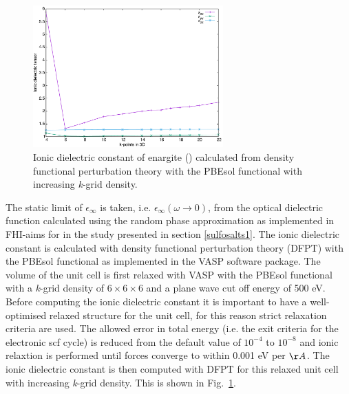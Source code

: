 \documentclass[11pt, twoside]{report}
\begin{document}
\begin{figure}[h!]
    \centering
    \includegraphics[width=0.65\textwidth]{figures/enargite_ionic_dielectric.pdf}
    \caption{Ionic dielectric constant of enargite ({\enargite}) calculated from density functional perturbation theory with the PBEsol functional with increasing \textit{k}-grid density.}
    \label{enargite_ionic_dielectric}
\end{figure}

The static limit of $\epsilon_{\infty}$ is taken, i.e.  $\epsilon_{\infty}(\omega \rightarrow 0)$, from the optical dielectric function calculated using the random phase approximation as implemented in FHI-aims for {\enargite} in the study presented in section \ref{sulfosalts1}.
The ionic dielectric constant is calculated with density functional perturbation theory (DFPT) with the PBEsol functional as implemented in the VASP \cite{VASP} software package. The volume of the unit cell is first relaxed with VASP with the PBEsol functional with a \textit{k}-grid density of $6\times6\times6$ and a plane wave cut off energy of 500 eV. Before computing the ionic dielectric constant it is important to have a well-optimised relaxed structure for the unit cell, for this reason strict relaxation criteria are used. The allowed error in total energy (i.e. the exit criteria for the electronic scf cycle) is reduced from the default value of $10^{-4}$ to $10^{-8}$ and ionic relaxtion is performed until forces converge to within 0.001 eV per $\AA$. The ionic dielectric constant is then computed with DFPT for this relaxed unit cell with increasing \textit{k}-grid density. This is shown in Fig.~\ref{enargite_ionic_dielectric}.

\end{document}
